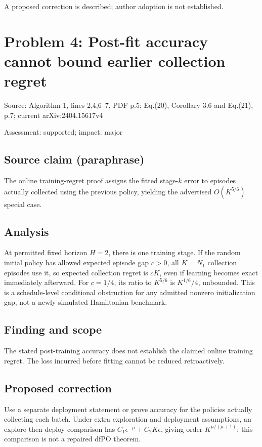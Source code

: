 \documentclass[11pt]{article}
\begin{document}
A proposed correction is described; author adoption is not established.

\section*{Problem 4: Post-fit accuracy cannot bound earlier collection regret}

Source: Algorithm 1, lines 2,4,6–7, PDF p.5; Eq.(20), Corollary 3.6 and Eq.(21), p.7; current arXiv:2404.15617v4

Assessment: supported; impact: major

\subsection*{Source claim (paraphrase)}

The online training-regret proof assigns the fitted stage-\(k\) error to episodes actually collected using the previous policy, yielding the advertised \(O(K^{5/6})\) special case.

\subsection*{Analysis}

At permitted fixed horizon \(H=2\), there is one training stage. If the random initial policy has allowed expected episode gap \(c>0\), all \(K=N_1\) collection episodes use it, so expected collection regret is \(cK\), even if learning becomes exact immediately afterward. For \(c=1/4\), its ratio to \(K^{5/6}\) is \(K^{1/6}/4\), unbounded. This is a schedule-level conditional obstruction for any admitted nonzero initialization gap, not a newly simulated Hamiltonian benchmark.

\subsection*{Finding and scope}

The stated post-training accuracy does not establish the claimed online training regret. The loss incurred before fitting cannot be reduced retroactively.

\subsection*{Proposed correction}

Use a separate deployment statement or prove accuracy for the policies actually collecting each batch. Under extra exploration and deployment assumptions, an explore-then-deploy comparison has \(C_1\epsilon^{-\mu}+C_2K\epsilon\), giving order \(K^{\mu/(\mu+1)}\); this comparison is not a repaired dfPO theorem.
\end{document}

